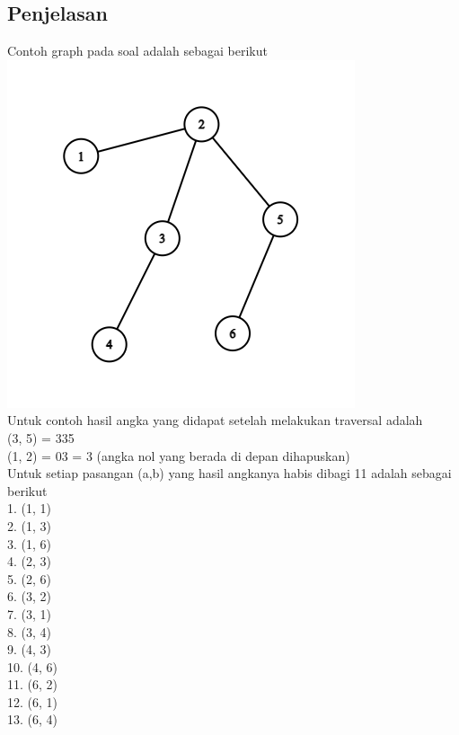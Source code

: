 \documentclass{article}
\begin{document}
\subsection*{Penjelasan}
Contoh graph pada soal adalah sebagai berikut \\
\includegraphics[scale=0.6]{graph} \\
Untuk contoh hasil angka yang didapat setelah melakukan traversal adalah\\
(3, 5) = 335\\
(1, 2) = 03 = 3 (angka nol yang berada di depan dihapuskan)\\
Untuk setiap pasangan (a,b) yang hasil angkanya habis dibagi 11 adalah sebagai berikut\\
1. (1, 1)\\
2. (1, 3)\\
3. (1, 6)\\
4. (2, 3)\\
5. (2, 6)\\
6. (3, 2)\\
7. (3, 1)\\
8. (3, 4)\\
9. (4, 3)\\
10. (4, 6)\\
11. (6, 2)\\
12. (6, 1)\\
13. (6, 4)
\end{document}

